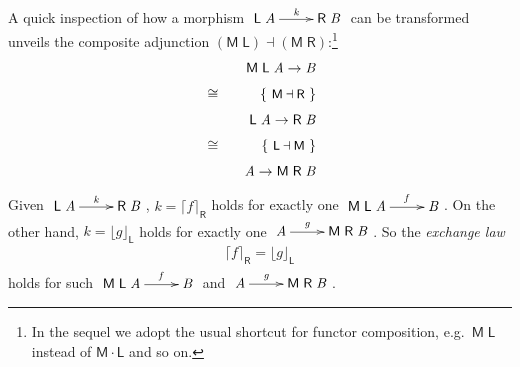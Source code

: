 \documentclass{elsarticle}
\newcommand{\Conid}[1]{\mathit{#1}}
\newcommand{\Varid}[1]{\mathit{#1}}
\def\comp{ \mathbin{\cdot} }
\def\fun#1{\mathsf{#1}}
\def\just#1#2{\\ &#1& \rule{2em}{0pt} \{ \mbox{\rule[-.7em]{0pt}{1.8em} \small #2 \/} \} \nonumber\\ && }
\def\iso{\cong}
\def\start{&&}
\def\rarrow#1#2#3{\xymatrix{ #1 \ar[r]^-{#2} & #3 }}
\begin{document}
A quick inspection of how a morphism \ensuremath{\rarrow{\fun L \;\Conid{A}}{\Varid{k}}{\fun R \;\Conid{B}}}
can be transformed unveils the composite adjunction \ensuremath{(\fun M \;\fun L )\mathbin\dashv (\fun M \;\fun R )}:\footnote{
In the sequel we adopt the usual shortcut for functor composition,
e.g.\ \ensuremath{\fun M \;\fun L } instead of \ensuremath{\fun M  \comp \fun L } and so on.}
\begin{eqnarray*}
\start
	\ensuremath{\fun M \;\fun L \;\Conid{A}\to \Conid{B}}
%
\just\iso{ \ensuremath{\fun M \mathbin\dashv \fun R } }
%
	\ensuremath{\fun L \;\Conid{A}\to \fun R \;\Conid{B}}
%
\just\iso{ \ensuremath{\fun L \mathbin\dashv \fun M } }
%
	\ensuremath{\Conid{A}\to \fun M \;\fun R \;\Conid{B}}
%
\end{eqnarray*}
Given \ensuremath{\rarrow{\fun L \;\Conid{A}}{\Varid{k}}{\fun R \;\Conid{B}}},
\ensuremath{\Varid{k}\mathrel{=}\lceil \Varid{f}\rceil_{\fun R }} holds for exactly one \ensuremath{\rarrow{\fun M \;\fun L \;\Conid{A}}{\Varid{f}}{\Conid{B}}}.
On the other hand, \ensuremath{\Varid{k}\mathrel{=}\lfloor \Varid{g}\rfloor_{\fun L }} holds for exactly one \ensuremath{\rarrow{\Conid{A}}{\Varid{g}}{\fun M \;\fun R \;\Conid{B}}}.
So the \emph{exchange law}
\begin{eqnarray}
	\ensuremath{\lceil \Varid{f}\rceil_{\fun R }\mathrel{=}\lfloor \Varid{g}\rfloor_{\fun L }}
\end{eqnarray}
holds for such
	\ensuremath{\rarrow{\fun M \;\fun L \;\Conid{A}}{\Varid{f}}{\Conid{B}}}
and
	\ensuremath{\rarrow{\Conid{A}}{\Varid{g}}{\fun M \;\fun R \;\Conid{B}}}.
\end{document}
